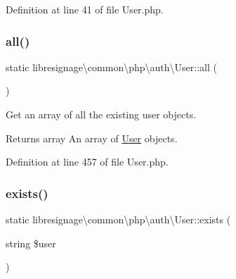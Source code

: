 Definition at line 41 of file User.\+php.

\mbox{\label{classlibresignage_1_1common_1_1php_1_1auth_1_1User_a2e06cc5de5496d8cc87bc4fa74042162}} 
\subsubsection{\texorpdfstring{all()}{all()}}
{\footnotesize\ttfamily static libresignage\textbackslash{}common\textbackslash{}php\textbackslash{}auth\textbackslash{}\+User\+::all (\begin{DoxyParamCaption}{ }\end{DoxyParamCaption})\hspace{0.3cm}{\ttfamily [static]}}

Get an array of all the existing user objects.

\begin{DoxyReturn}{Returns}
array An array of \hyperlink{classlibresignage_1_1common_1_1php_1_1auth_1_1User}{User} objects. 
\end{DoxyReturn}


Definition at line 457 of file User.\+php.

\mbox{\label{classlibresignage_1_1common_1_1php_1_1auth_1_1User_a29b2b1bfa6e43685782cdffd4e862918}} 
\subsubsection{\texorpdfstring{exists()}{exists()}}
{\footnotesize\ttfamily static libresignage\textbackslash{}common\textbackslash{}php\textbackslash{}auth\textbackslash{}\+User\+::exists (\begin{DoxyParamCaption}\item[{string}]{\$user }\end{DoxyParamCaption})\hspace{0.3cm}{\ttfamily [static]}}

